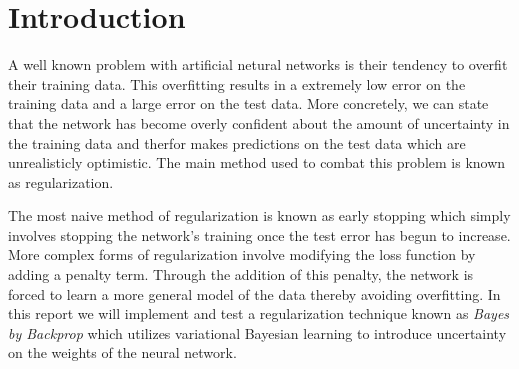 \documentclass[11pt]{article}
\begin{document}
\setcounter{section}{0}
\thispagestyle{empty}

\noindent{}
\bigskip

\newcommand\Ind{{\mathbb{I}}}
\newcommand\Exp{{\mathbb{E}}}
\newcommand\KL{{\operatorname{KL}}}

\section{Introduction}
A well known problem with artificial netural networks is their tendency to 
overfit their training data. This overfitting results in a extremely low 
error on the training data and a large error on the test data. More concretely,
we can state that the network has become overly confident about the amount of
uncertainty in the training data and therfor makes predictions on the test
data which are unrealisticly optimistic. The main method used to combat 
this problem is known as regularization. 

The most naive method of regularization is known as early stopping which simply
involves stopping the network's training once the test error has begun to
increase. More complex forms of regularization involve modifying the loss 
function by adding a penalty term. Through the addition of this penalty, the
network is forced to learn a more general model of the data thereby avoiding
overfitting. In this report we will implement and test a regularization 
technique known as \textit{Bayes by Backprop}\cite{blundell} which utilizes 
variational Bayesian learning to introduce uncertainty on the weights of the 
neural network.
\end{document}
